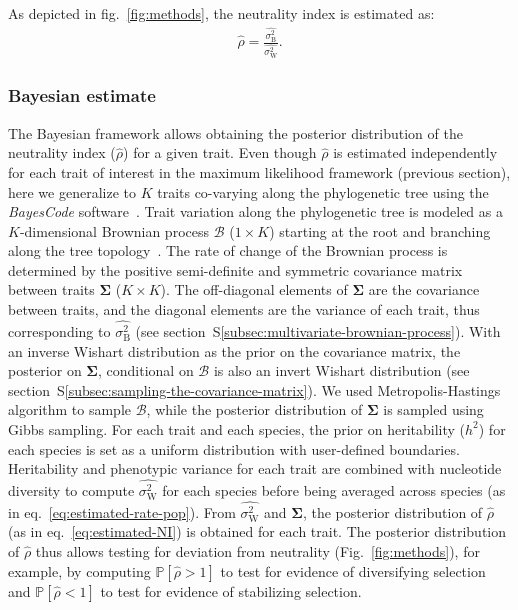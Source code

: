 \documentclass{article}
\newcommand{\UniDimArray}[1]{\bm{#1}}
\newcommand{\BiDimArray}[1]{\bm{#1}}
\newcommand{\proba}{\mathbb{P}}
\newcommand{\Heritability}{h^2}
\newcommand{\RateBetween}{\sigma^2_{\mathrm{B}}}
\newcommand{\RateWhithin}{\sigma^2_{\mathrm{W}}}
\newcommand{\EstRateBetween}{\widehat{\RateBetween}}
\newcommand{\EstRateWhithin}{\widehat{\RateWhithin}}
\newcommand{\EstNI}{\widehat{\rho}}
\newcommand{\Ntrait}{K}
\newcommand{\Covariancematrix}{\Sigma}
\newcommand{\CovarianceMatrix}{\BiDimArray{\Covariancematrix}}
\newcommand{\brownian}{\mathcal{B}}
\newcommand{\Brownian}{\UniDimArray{\brownian}}
\begin{document}
As depicted in fig.~\ref{fig:methods}, the neutrality index is estimated as:
\begin{gather}
    \EstNI = \frac{\EstRateBetween}{\EstRateWhithin}. \label{eq:estimated-NI}
\end{gather}

\subsubsection*{Bayesian estimate}

The Bayesian framework allows obtaining the posterior distribution of the neutrality index ($\EstNI$) for a given trait.
Even though $\EstNI$ is estimated independently for each trait of interest in the maximum likelihood framework (previous section), here we generalize to $\Ntrait$ traits co-varying along the phylogenetic tree using the \textit{BayesCode} software~\parencite{latrille_inferring_2021}.
Trait variation along the phylogenetic tree is modeled as a $\Ntrait$-dimensional Brownian process $\Brownian$ ($1 \times \Ntrait$) starting at the root and branching along the tree topology~\parencite{huelsenbeck_detecting_2003, lartillot_phylogenetic_2011, lartillot_joint_2012, latrille_inferring_2021}.
The rate of change of the Brownian process is determined by the positive semi-definite and symmetric covariance matrix between traits $\CovarianceMatrix$ ($\Ntrait \times \Ntrait$).
The off-diagonal elements of $\CovarianceMatrix$ are the covariance between traits, and the diagonal elements are the variance of each trait, thus corresponding to $\EstRateBetween$ (see section~S\ref{subsec:multivariate-brownian-process}).
With an inverse Wishart distribution as the {prior} on the covariance matrix, the {posterior} on $\CovarianceMatrix$, conditional on $\brownian$ is also an invert Wishart distribution (see section~S\ref{subsec:sampling-the-covariance-matrix}).
We used Metropolis-Hastings algorithm to sample $\Brownian$, while the posterior distribution of $\CovarianceMatrix$ is sampled using Gibbs sampling.
For each trait and each species, the prior on heritability ($\Heritability$) for each species is set as a uniform distribution with user-defined boundaries.
Heritability and phenotypic variance for each trait are combined with nucleotide diversity to compute $\EstRateWhithin$ for each species before being averaged across species (as in eq.~\ref{eq:estimated-rate-pop}).
From $\EstRateWhithin$ and $\CovarianceMatrix$, the posterior distribution of $\EstNI$ (as in eq.~\ref{eq:estimated-NI}) is obtained for each trait.
The posterior distribution of $\EstNI$ thus allows testing for deviation from neutrality (Fig.~\ref{fig:methods}), for example, by computing $\proba [\EstNI > 1 ]$ to test for evidence of diversifying selection and $\proba [\EstNI < 1 ]$ to test for evidence of stabilizing selection.
\end{document}
